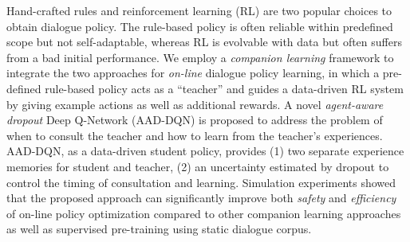 Hand-crafted rules and reinforcement learning (RL) are two popular choices to obtain dialogue policy.  The rule-based policy is often reliable within predefined scope but not self-adaptable, whereas RL is evolvable with data but often suffers from a bad initial performance. We employ a {\em companion learning} framework to integrate the two approaches for {\em on-line} dialogue policy learning, in which a pre-defined rule-based policy acts as a ``teacher'' and guides a data-driven RL system by giving example actions as well as additional rewards. A novel {\em agent-aware dropout} Deep Q-Network (AAD-DQN) is proposed to address the problem of when to consult the teacher and how to learn from the teacher's experiences. AAD-DQN, as a data-driven student policy, provides (1) two separate experience memories for student and teacher, (2) an uncertainty estimated by dropout to control the timing of consultation and learning. Simulation experiments showed that the proposed approach can significantly improve both {\em safety} and {\em efficiency} of on-line policy optimization compared to other companion learning approaches as well as supervised pre-training using static dialogue corpus.
